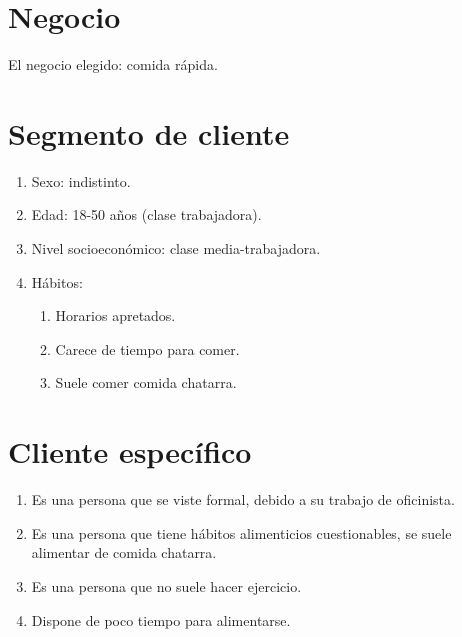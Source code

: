 





\section{Negocio}

El negocio elegido: comida rápida. 

\section{Segmento de cliente }

\begin{enumerate}
	\item Sexo: indistinto.
	\item Edad: 18-50 años (clase trabajadora).
	\item Nivel socioeconómico: clase media-trabajadora. 
	\item Hábitos: \begin{enumerate}
		\item Horarios apretados. 
		\item Carece de tiempo para comer. 
		\item Suele comer comida chatarra. 
	\end{enumerate}
\end{enumerate}

\section{Cliente específico}

\begin{enumerate}
	\item Es una persona que se viste formal, debido a su trabajo de oficinista. 
	\item Es una persona que tiene hábitos alimenticios cuestionables, se suele alimentar de comida chatarra. 
	\item Es una persona que no suele hacer ejercicio. 
	\item Dispone de poco tiempo para alimentarse. 
\end{enumerate}



%
%

